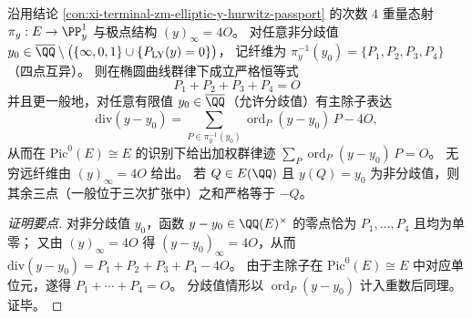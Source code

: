 \begin{conclusion}\label{con:xi-terminal-zm-elliptic-weight-fiber-sum-zero}
沿用结论 \ref{con:xi-terminal-zm-elliptic-y-hurwitz-passport} 的次数 \(4\) 重量态射
\(
\pi_y:E\to\PP^1_y
\)
与极点结构 \((y)_\infty=4O\)。
对任意非分歧值 \(y_0\in\overline{\QQ}\setminus\bigl(\{\infty,0,1\}\cup\{P_{\mathrm{LY}}(y)=0\}\bigr)\)，
记纤维为
\(
\pi_y^{-1}(y_0)=\{P_1,P_2,P_3,P_4\}
\)
（四点互异）。
则在椭圆曲线群律下成立严格恒等式
\[
\boxed{\;P_1+P_2+P_3+P_4=O\;}
\]
并且更一般地，对任意有限值 \(y_0\in\overline{\QQ}\)（允许分歧值）有主除子表达
\[
\mathrm{div}(y-y_0)=\sum_{P\in \pi_y^{-1}(y_0)}\operatorname{ord}_{P}(y-y_0)\,P-4O,
\]
从而在 \(\mathrm{Pic}^0(E)\cong E\) 的识别下给出加权群律迹
\(
\sum_{P}\operatorname{ord}_{P}(y-y_0)\,P=O
\)。
无穷远纤维由 \((y)_\infty=4O\) 给出。
若 \(Q\in E(\QQ)\) 且 \(y(Q)=y_0\) 为非分歧值，则其余三点（一般位于三次扩张中）之和严格等于 \(-Q\)。
\end{conclusion}
\begin{proof}[证明要点]
对非分歧值 \(y_0\)，函数 \(y-y_0\in\QQ(E)^\times\) 的零点恰为 \(P_1,\dots,P_4\) 且均为单零；
又由 \((y)_\infty=4O\) 得 \((y-y_0)_\infty=4O\)，从而
\(
\mathrm{div}(y-y_0)=P_1+P_2+P_3+P_4-4O
\)。
由于主除子在 \(\mathrm{Pic}^0(E)\cong E\) 中对应单位元，遂得 \(P_1+\cdots+P_4=O\)。
分歧值情形以 \(\operatorname{ord}_{P}(y-y_0)\) 计入重数后同理。证毕。
\end{proof}

